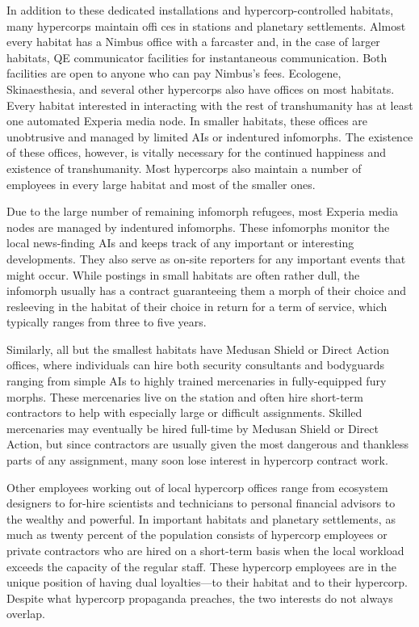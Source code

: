In addition to these dedicated installations and hypercorp-controlled
habitats, many hypercorps maintain offi ces in stations and planetary
settlements. Almost every habitat has a Nimbus office with a farcaster
and, in the case of larger habitats, QE communicator facilities for
instantaneous communication. Both facilities are open to anyone who
can pay Nimbus's fees. Ecologene, Skinaesthesia, and several other
hypercorps also have offices on most habitats. Every habitat
interested in interacting with the rest of transhumanity has at least
one automated Experia media node. In smaller habitats, these offices
are unobtrusive and managed by limited AIs or indentured
infomorphs. The existence of these offices, however, is vitally
necessary for the continued happiness and existence of
transhumanity. Most hypercorps also maintain a number of employees in
every large habitat and most of the smaller ones.

Due to the large number of remaining infomorph refugees, most Experia
media nodes are managed by indentured infomorphs. These infomorphs
monitor the local news-finding AIs and keeps track of any important or
interesting developments. They also serve as on-site reporters for any
important events that might occur. While postings in small habitats
are often rather dull, the infomorph usually has a contract
guaranteeing them a morph of their choice and resleeving in the
habitat of their choice in return for a term of service, which
typically ranges from three to five years.

Similarly, all but the smallest habitats have Medusan Shield or Direct
Action offices, where individuals can hire both security consultants
and bodyguards ranging from simple AIs to highly trained mercenaries
in fully-equipped fury morphs. These mercenaries live on the station
and often hire short-term contractors to help with especially large or
difficult assignments. Skilled mercenaries may eventually be hired
full-time by Medusan Shield or Direct Action, but since contractors
are usually given the most dangerous and thankless parts of any
assignment, many soon lose interest in hypercorp contract work.

Other employees working out of local hypercorp offices range from
ecosystem designers to for-hire scientists and technicians to personal
financial advisors to the wealthy and powerful. In important habitats
and planetary settlements, as much as twenty percent of the population
consists of hypercorp employees or private contractors who are hired
on a short-term basis when the local workload exceeds the capacity of
the regular staff. These hypercorp employees are in the unique
position of having dual loyalties—to their habitat and to their
hypercorp. Despite what hypercorp propaganda preaches, the two
interests do not always overlap.

